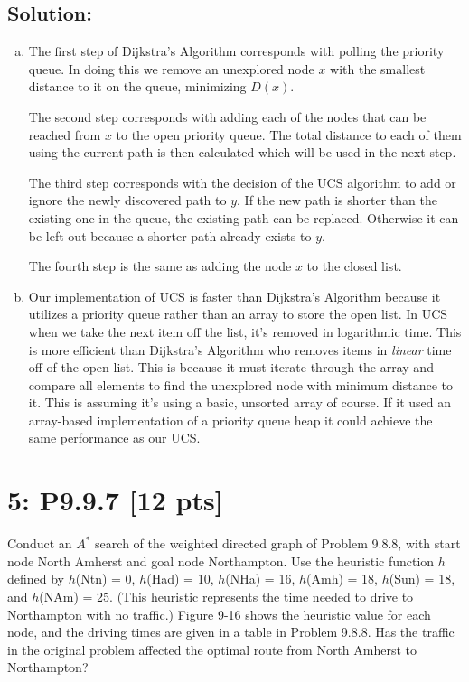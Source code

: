 \documentclass[12pt]{article}
\begin{document}
\subsection*{\textbf{Solution:}}
\begin{enumerate}[(a)]
    \item The first step of Dijkstra's Algorithm corresponds with polling the priority queue. In doing this we remove an unexplored node $x$ with the smallest distance to it on the queue, minimizing $D(x)$.

		The second step corresponds with adding each of the nodes that can be reached from $x$ to the open priority queue. The total distance to each of them using the current path is then calculated which will be used in the next step.

		The third step corresponds with the decision of the UCS algorithm to add or ignore the newly discovered path to $y$. If the new path is shorter than the existing one in the queue, the existing path can be replaced. Otherwise it can be left out because a shorter path already exists to $y$.

		The fourth step is the same as adding the node $x$ to the closed list.

    \item Our implementation of UCS is faster than Dijkstra's Algorithm because it utilizes a priority queue rather than an array to store the open list. In UCS when we take the next item off the list, it's removed in logarithmic time. This is more efficient than Dijkstra's Algorithm who removes items in \textit{linear} time off of the open list. This is because it must iterate through the array and compare all elements to find the unexplored node with minimum distance to it. This is assuming it's using a basic, unsorted array of course. If it used an array-based implementation of a priority queue heap it could achieve the same performance as our UCS.
\end{enumerate}


\newpage
\section*{\textbf{5: P9.9.7} [12 pts]}
Conduct an $A^*$ search of the weighted directed graph of Problem 9.8.8, with start node North Amherst and goal node Northampton. Use the heuristic function $h$ defined by $h$(Ntn) = 0, $h$(Had) = 10, $h$(NHa) = 16, $h$(Amh) = 18, $h$(Sun) = 18, and $h$(NAm) = 25. (This heuristic represents the time needed to drive to Northampton with no traffic.) Figure 9-16 shows the heuristic value for each node, and the driving times are given in a table in Problem 9.8.8. Has the traffic in the original problem affected the optimal route from North Amherst to Northampton?
\end{document}
